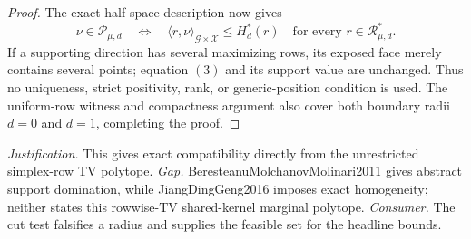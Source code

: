 \documentclass{article}
\begin{document}
\begin{proof}
The exact half-space description now gives
\[
 \nu\in\mathcal P_{\mu,d}
 \quad\Longleftrightarrow\quad
 \langle r,\nu\rangle_{\mathcal G\times\mathcal X}\le H_d^*(r)
 \quad\text{for every }r\in\mathcal R_{\mu,d}^*.
\]
If a supporting direction has several maximizing rows, its exposed face merely contains several points; equation \((3)\) and its support value are unchanged.  Thus no uniqueness, strict positivity, rank, or generic-position condition is used.  The uniform-row witness and compactness argument also cover both boundary radii \(d=0\) and \(d=1\), completing the proof.
\end{proof}
\par\smallskip\noindent \textit{Justification.} This gives exact compatibility directly from the unrestricted simplex-row TV polytope. \textit{Gap.} BeresteanuMolchanovMolinari2011 gives abstract support domination, while JiangDingGeng2016 imposes exact homogeneity; neither states this rowwise-TV shared-kernel marginal polytope. \textit{Consumer.} The cut test falsifies a radius and supplies the feasible set for the headline bounds.
\end{document}
